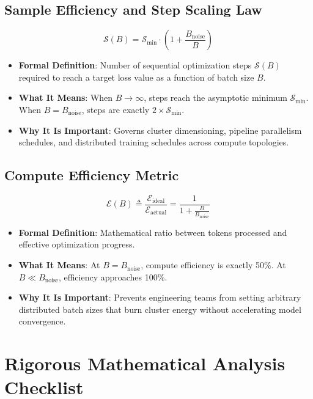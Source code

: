 \documentclass[11pt,a4paper]{article}
\theoremstyle{definition}
\begin{document}
\subsection{Sample Efficiency and Step Scaling Law}
{\boldmath
\begin{equation}
\mathcal{S}(B) = \mathcal{S}_{\min} \cdot \left( 1 + \frac{B_{\text{noise}}}{B} \right)
\end{equation}
}
\begin{itemize}
    \item \textbf{Formal Definition}: Number of sequential optimization steps $\mathcal{S}(B)$ required to reach a target loss value as a function of batch size $B$.
    \item \textbf{What It Means}: When $B \to \infty$, steps reach the asymptotic minimum $\mathcal{S}_{\min}$. When $B = B_{\text{noise}}$, steps are exactly $2 \times \mathcal{S}_{\min}$.
    \item \textbf{Why It Is Important}: Governs cluster dimensioning, pipeline parallelism schedules, and distributed training schedules across compute topologies.
\end{itemize}

\subsection{Compute Efficiency Metric}
{\boldmath
\begin{equation}
\mathcal{E}(B) \triangleq \frac{\mathcal{E}_{\text{ideal}}}{\mathcal{E}_{\text{actual}}} = \frac{1}{1 + \frac{B}{B_{\text{noise}}}}
\end{equation}
}
\begin{itemize}
    \item \textbf{Formal Definition}: Mathematical ratio between tokens processed and effective optimization progress.
    \item \textbf{What It Means}: At $B = B_{\text{noise}}$, compute efficiency is exactly 50\%. At $B \ll B_{\text{noise}}$, efficiency approaches 100\%.
    \item \textbf{Why It Is Important}: Prevents engineering teams from setting arbitrary distributed batch sizes that burn cluster energy without accelerating model convergence.
\end{itemize}

\section{Rigorous Mathematical Analysis Checklist}
\end{document}
